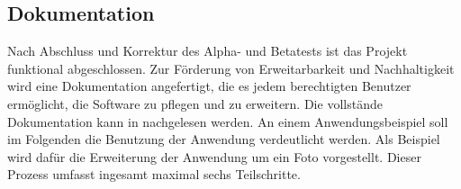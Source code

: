 \subsection{Dokumentation}
\label{sec:Dokumentation}

Nach Abschluss und Korrektur des Alpha- und Betatests ist das Projekt funktional abgeschlossen. Zur Förderung von Erweitarbarkeit und Nachhaltigkeit wird eine Dokumentation angefertigt, die es jedem berechtigten Benutzer ermöglicht, die Software zu pflegen und zu erweitern. Die vollstände Dokumentation kann in \citet{dokumentation2014} nachgelesen werden. 
An einem Anwendungsbeispiel soll im Folgenden die Benutzung der Anwendung verdeutlicht werden. Als Beispiel wird dafür die Erweiterung der Anwendung um ein Foto vorgestellt. Dieser Prozess umfasst ingesamt maximal sechs Teilschritte.

